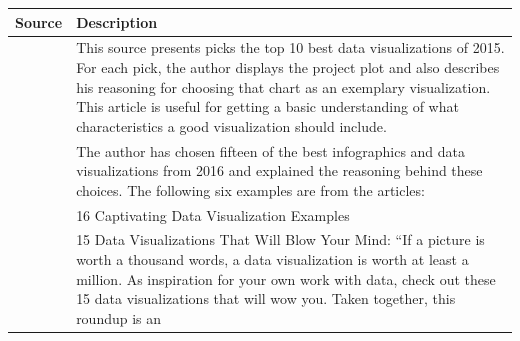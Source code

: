 \documentclass[]{book}
\theoremstyle{definition}
\theoremstyle{definition}
\theoremstyle{definition}
\theoremstyle{remark}
\begin{document}
\begin{longtable}[]{@{}ll@{}}
\toprule
\begin{minipage}[b]{0.15\columnwidth}\raggedright\strut
\textbf{Source}\strut
\end{minipage} & \begin{minipage}[b]{0.79\columnwidth}\raggedright\strut
\textbf{Description}\strut
\end{minipage}\tabularnewline
\midrule
\endhead
\begin{minipage}[t]{0.15\columnwidth}\raggedright\strut
\citep{10_BEST}\strut
\end{minipage} & \begin{minipage}[t]{0.79\columnwidth}\raggedright\strut
This source presents picks the top 10 best data visualizations of 2015.
For each pick, the author displays the project plot and also describes
his reasoning for choosing that chart as an exemplary visualization.
This article is useful for getting a basic understanding of what
characteristics a good visualization should include.\strut
\end{minipage}\tabularnewline
\begin{minipage}[t]{0.15\columnwidth}\raggedright\strut
\citep{cool_data}\strut
\end{minipage} & \begin{minipage}[t]{0.79\columnwidth}\raggedright\strut
The author has chosen fifteen of the best infographics and data
visualizations from 2016 and explained the reasoning behind these
choices. The following six examples are from the articles:\strut
\end{minipage}\tabularnewline
\begin{minipage}[t]{0.15\columnwidth}\raggedright\strut
\citep{int_viz_capt}\strut
\end{minipage} & \begin{minipage}[t]{0.79\columnwidth}\raggedright\strut
16 Captivating Data Visualization Examples\strut
\end{minipage}\tabularnewline
\begin{minipage}[t]{0.15\columnwidth}\raggedright\strut
\citep{15_mindblowing}\strut
\end{minipage} & \begin{minipage}[t]{0.79\columnwidth}\raggedright\strut
15 Data Visualizations That Will Blow Your Mind: ``If a picture is worth
a thousand words, a data visualization is worth at least a million. As
inspiration for your own work with data, check out these 15 data
visualizations that will wow you. Taken together, this roundup is an

\end{minipage}
\end{longtable}
\end{document}
